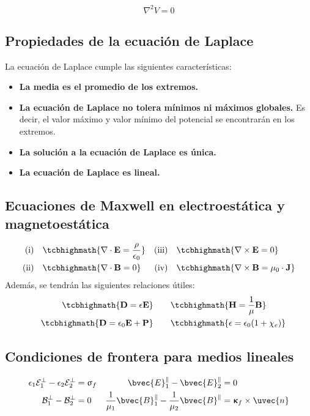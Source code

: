 \documentclass[
  11pt,
  letterpaper,
   answers
  ]{exam}
\begin{document}
\begin{equation}
\nabla^{2} V = 0
\end{equation}

\subsection*{Propiedades de la ecuación de Laplace}
La ecuación de Laplace cumple las siguientes características:
\begin{itemize}
    \item \textbf{La media es el promedio de los extremos.}
    \item \textbf{La ecuación de Laplace no tolera mínimos ni máximos globales.} Es decir, el valor máximo y valor mínimo del potencial se encontrarán en los extremos.
    \item \textbf{La solución a la ecuación de Laplace es única.}
    \item \textbf{La ecuación de Laplace es lineal.}
\end{itemize}
\subsection*{Ecuaciones de Maxwell en electroestática y magnetoestática}
\begin{align}
  \text{(i)}&\quad \tcbhighmath{\nabla\cdot \mathbf{E}= \frac{\rho}{\epsilon_0}} & \text{(iii)}&\quad \tcbhighmath{\nabla\times \mathbf{E} = 0}\\
  \text{(ii)}&\quad \tcbhighmath{\nabla\cdot \mathbf{B} = 0} & \text{(iv)}&\quad \tcbhighmath{\nabla\times \mathbf{B} = \mu_0 \cdot \mathbf{J}}
  \end{align}
  Además, se tendrán las siguientes relaciones útiles:
  \begin{align}
      \quad \tcbhighmath{\mathbf{D} = \epsilon \mathbf{E}} &&& \quad \tcbhighmath{\mathbf{H}= \frac{1}{\mu}\mathbf{B}}\\
      \quad \tcbhighmath{\mathbf{D} = \epsilon_0 \mathbf{E} + \mathbf{P}} &&& \quad \tcbhighmath{\epsilon = \epsilon_0 (1+\chi_e)}
  \end{align}
\subsection*{Condiciones de frontera para medios lineales}

\begin{align*}
    \epsilon_1\mathcal{E}_1^\bot - \epsilon_2\mathcal{E}_2^\bot &= \upsigma_f &
    \bvec{E}_1^\parallel - \bvec{E}_2^\parallel &= 0\\
    \mathcal{B}_1^\bot - \mathcal{B}_2^\bot &= 0 &
    \frac{1}{\mu_1}\bvec{B}_1^\parallel - \frac{1}{\mu_2}\bvec{B}^\parallel &= \boldsymbol{\upkappa}_f\times\uvec{n}
\end{align*}
\end{document}
